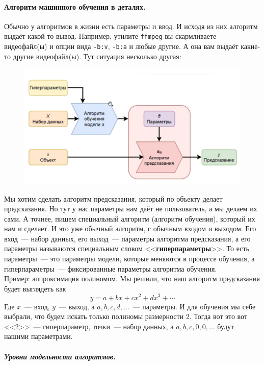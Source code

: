 \documentclass{article}
\begin{document}
    \paragraph{Алгоритм машинного обучения в деталях.}
    Обычно у алгоритмов в жизни есть параметры и ввод. И исходя из них алгоритм выдаёт какой-то вывод. Например, утилите \Verb|ffmpeg| вы скармливаете видеофайл(ы) и опции вида \Verb|-b:v|, \Verb|-b:a| и любые другие. А она вам выдаёт какие-то другие видеофайл(ы). Тут ситуация несколько другая:
    \begin{figure}[H]
        \includegraphics[width=0.8\linewidth]{Images/ml_scheme.png}
        \label{img:ml_scheme}
    \end{figure}\noindent
    Мы хотим сделать алгоритм предсказания, который по объекту делает предсказания. Но тут у нас параметры нам даёт не пользователь, а мы делаем их сами. А точнее, пишем специальный алгоритм (алгоритм обучения), который их нам и сделает. И это уже обычный алгоритм, с обычным входом и выходом. Его вход~--- набор данных, его выход~--- параметры алгоритма предсказания, а его параметры называются специальным словом <<\textbf{гиперпараметры}>>. То есть параметры~--- это параметры модели, которые меняются в процессе обучения, а гиперпараметры~--- фиксированные параметры алгоритма обучения.\\
    Пример: аппроксимация полиномом. Мы решили, что наш алгоритм предсказания будет выглядеть как
    \[
    y=a+bx+cx^2+dx^3+\cdots
    \]
    Где $x$~--- вход, $y$~--- выход, а $a,b,c,d,\ldots$~--- параметры. И для обучения мы себе выбрали, что будем искать только полиномы размерности 2. Тогда вот это вот <<2>>~--- гиперпараметр, точки~--- набор данных, а $a,b,c,0,0,\ldots$ будут нашими параметрами.
    \subparagraph{Уровни модельности алгоритмов.}
\end{document}
